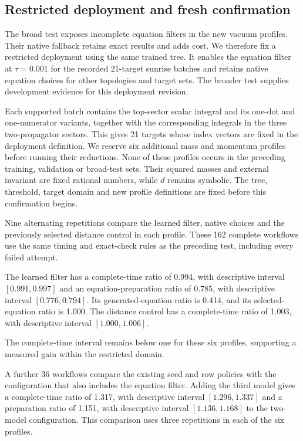 \clearpage
\subsection{Restricted deployment and fresh confirmation}
The broad test exposes incomplete equation filters in the new vacuum
profiles. Their native fallback retains exact results and adds cost.
We therefore fix a restricted deployment using the same trained tree.
It enables the equation filter at $\tau=0.001$ for the recorded
21-target sunrise batches and retains native equation choices for
other topologies and target sets. The broader test supplies development
evidence for this deployment revision.

Each supported batch contains the top-sector scalar integral and its
one-dot and one-numerator variants, together with the corresponding
integrals in the three two-propagator sectors. This gives 21 targets
whose index vectors are fixed in the deployment definition.
We reserve six additional mass and momentum profiles before running
their reductions. None of these profiles occurs in the preceding
training, validation or broad-test sets. Their squared masses and
external invariant are fixed rational numbers, while $d$ remains symbolic.
The tree, threshold, target domain and new profile definitions are
fixed before this confirmation begins.

Nine alternating repetitions compare the learned filter, native choices
and the previously selected distance control in each profile. These
162 complete workflows use the same timing and exact-check rules
as the preceding test, including every failed attempt.

The learned filter has a complete-time ratio of 0.994, with descriptive interval $[0.991,0.997]$ and an equation-preparation ratio of 0.785, with descriptive interval $[0.776,0.794]$. Its generated-equation ratio is 0.414, and its selected-equation ratio is 1.000. The distance control has a complete-time ratio of 1.003, with descriptive interval $[1.000,1.006]$.

The complete-time interval remains below one for these six profiles, supporting a measured gain within the restricted domain.

A further 36 workflows compare the existing seed and row policies with the configuration that also includes the equation filter. Adding the third model gives a complete-time ratio of 1.317, with descriptive interval $[1.296,1.337]$ and a preparation ratio of 1.151, with descriptive interval $[1.136,1.168]$ to the two-model configuration. This comparison uses three repetitions in each of the six profiles.

